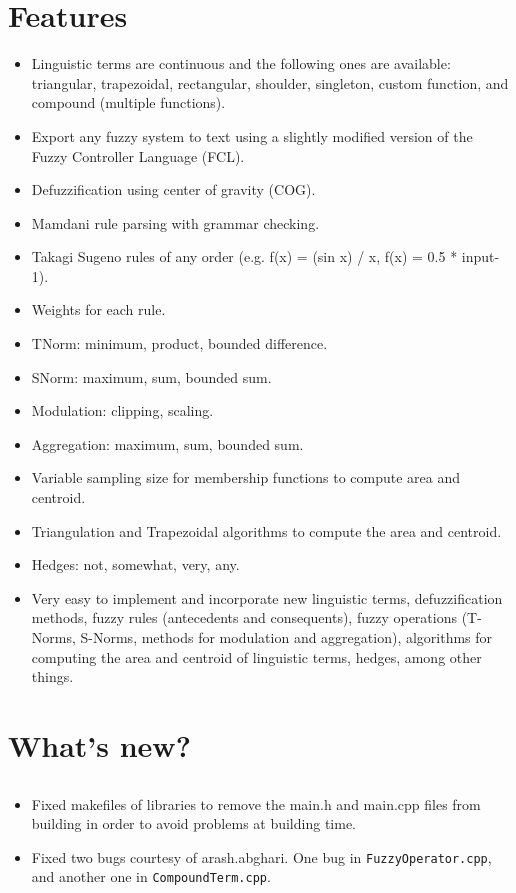 \section{Features}
\begin{itemize}
	\item Linguistic terms are continuous and the following ones are available: triangular, trapezoidal, rectangular, shoulder, singleton, custom function, and compound (multiple functions).
	\item Export any fuzzy system to text using a slightly modified version of the Fuzzy Controller Language (FCL).
	\item Defuzzification using center of gravity (COG). 
	\item Mamdani rule parsing with grammar checking.
	\item Takagi Sugeno rules of any order (e.g. f(x) = (sin x) / x, f(x) = 0.5 * input-1).
	\item Weights for each rule.
	\item TNorm: minimum, product, bounded difference. 
	\item SNorm: maximum, sum, bounded sum. 
	\item Modulation: clipping, scaling. 
	\item Aggregation: maximum, sum, bounded sum.
	\item Variable sampling size for membership functions to compute area and centroid.
	\item Triangulation and Trapezoidal algorithms to compute the area and
	centroid.
	\item Hedges: not, somewhat, very, any. 
	\item Very easy to implement and incorporate new linguistic terms, defuzzification methods, fuzzy rules (antecedents and consequents), fuzzy operations (T-Norms, S-Norms, methods for modulation and aggregation), algorithms for computing the area and centroid of linguistic terms, hedges, among other things.
	
\end{itemize}

\section{What's new?}

	\subsection{\fl}
	\begin{itemize} 
		\item Fixed makefiles of libraries to remove the main.h and main.cpp files from building in order to avoid problems at building time.
	  \item Fixed two bugs courtesy of arash.abghari. One bug in \texttt{FuzzyOperator.cpp}, and another one in \texttt{CompoundTerm.cpp}.
	\end{itemize} 
	
